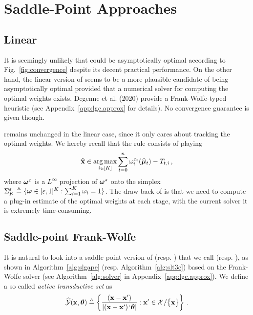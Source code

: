 \section{Saddle-Point Approaches}\label{sec:lgc.sp}

\subsection{Linear \texorpdfstring{\Track}{}}

It is seemingly unlikely that \LTCCG could be asymptotically optimal according to Fig.~\ref{fig:convergence} despite its decent practical performance. On the other hand, the linear version of \Track seems to be a more plausible candidate of being asymptotically optimal provided that a numerical solver for computing the optimal weights exists. Degenne et al. (2020) provide a Frank-Wolfe-typed heuristic (see Appendix~\ref{app:lgc.approx} for details). No convergence guarantee is given though.

\Track remains unchanged in the linear case, since it only cares about tracking the optimal weights. We hereby recall that the \CT rule consists of playing
\[
    \widehat{{\bf x}} \in \operatorname*{arg\,max}_{i\in[K]} \sum_{t=0}^n \omega_i^{\varepsilon_t}(\widehat{{\boldsymbol \mu}}_t)-T_{t,i}\,,
\]
where ${\boldsymbol \omega}^\varepsilon$ is a $L^\infty$ projection of ${\boldsymbol \omega}^\star$ onto the simplex $\Sigma_K^\varepsilon \triangleq \{{\boldsymbol \omega}\in [\varepsilon,1]^K : \sum_{i=1}^K \omega_i = 1\}$. The draw back of \Track is that we need to compute a plug-in estimate of the optimal weights at each stage, with the current solver it is extremely time-consuming.

\subsection{Saddle-point Frank-Wolfe}
It is natural to look into a saddle-point version of \LGapE (resp. \LTCC) that we call \SLGapE (resp. \SLTCC), as shown in Algorithm~\ref{alg:slgape} (resp. Algorithm~\ref{alg:slt3c}) based on the Frank-Wolfe solver (see Algorithm~\ref{alg:solver} in Appendix~\ref{app:lgc.approx}). We define a so called \emph{active transductive set} as
\begin{align}\label{def:active_transductive}
    \widehat{\mathcal{Y}}({\bf x},{\boldsymbol \theta}) \triangleq \left\{ \frac{({\bf x}- {\bf x}')}{\left|({\bf x}-{\bf x}')^\mathsf{\scriptscriptstyle T}{\boldsymbol \theta}\right|}: {\bf x}'\in\mathcal{X}/\big\{{\bf x}\big\}  \right\}\,.
\end{align}

